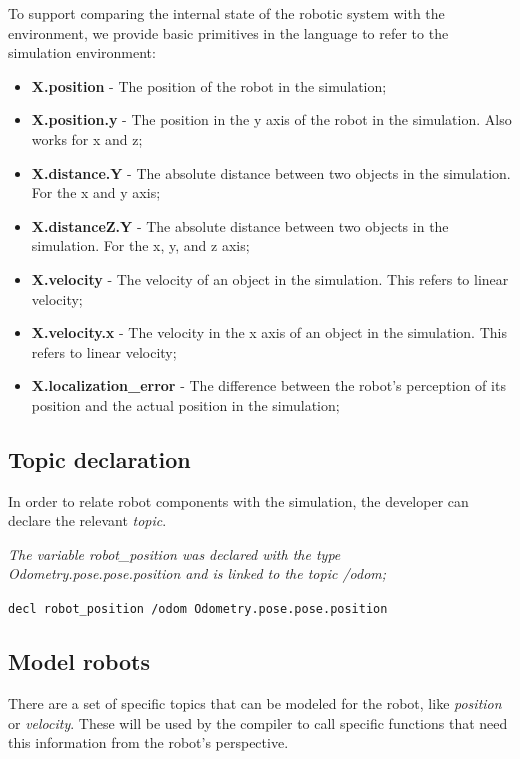 \documentclass[runningheads]{llncs}
\begin{document}
To support comparing the internal state of the robotic system with the environment, we provide basic primitives in the language to refer to the simulation environment:

\begin{itemize}
\item {\bfseries X.position} - The position of the robot in the simulation;
\item {\bfseries X.position.y} - The position in the y axis of the robot in the simulation. Also works for x and z;
\item {\bfseries X.distance.Y} - The absolute distance between two objects in the simulation. For the x and y axis;
\item {\bfseries X.distanceZ.Y} - The absolute distance between two objects in the simulation. For the x, y, and z axis;
\item {\bfseries X.velocity} - The velocity of an object in the simulation. This refers to linear velocity;
\item {\bfseries X.velocity.x} - The velocity in the x axis of an object in the simulation. This refers to linear velocity;
\item {\bfseries X.localization\_error} - The difference between the robot's perception of its position and the actual position in the simulation;
\end{itemize}


\subsection{Topic declaration}

In order to relate robot components with the simulation, the developer can declare the relevant \textit{topic}.

\textit{The variable robot\_position was declared with the type Odometry.pose.pose.position and is linked to the topic /odom;}

\vspace{2mm}

\texttt{decl robot\_position /odom Odometry.pose.pose.position}


\subsection{Model robots}

There are a set of specific topics that can be modeled for the robot, like \textit{position} or \textit{velocity}. These will be used by the compiler to call specific functions that need this information from the robot's perspective.
\end{document}
